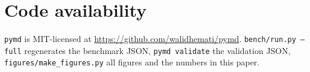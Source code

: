 \documentclass[11pt]{article}
\newcommand{\pymd}{\texttt{pymd}}
\begin{document}
\section*{Code availability}
\pymd{} is MIT-licensed at \url{https://github.com/walidhemati/pymd}. \texttt{bench/run.py --full}
regenerates the benchmark JSON, \texttt{pymd validate} the validation JSON,
\texttt{figures/make\_figures.py} all figures and the numbers in this paper.

\renewcommand{\bibfont}{\small}
\setlength{\bibsep}{2pt plus 1pt}


\end{document}
